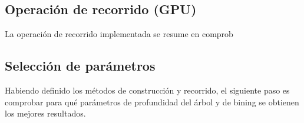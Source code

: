 \subsection{Operación de recorrido (GPU)}


La operación de recorrido implementada se resume en comprob


\subsection{Selección de parámetros}

Habiendo definido los métodos de construcción y recorrido, el siguiente paso es comprobar para qué parámetros de profundidad del árbol y de bining se obtienen los mejores resultados.



